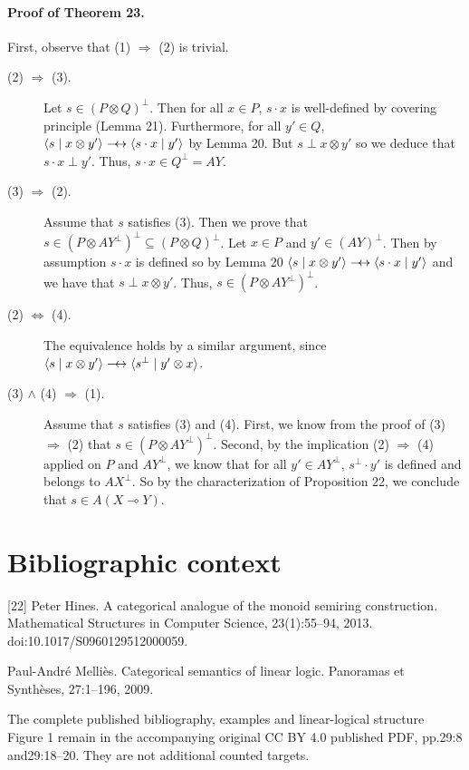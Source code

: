 \documentclass[10pt,a4paper]{article}
\newcommand{\lolli}{\multimap}
\newcommand{\dequiv}{\mathrel{\relbar\joinrel\leftrightarrow}}
\newcommand{\scalar}[2]{\langle #1\mid #2\rangle}
\begin{document}
\paragraph{Proof of Theorem 23.} First, observe that (1) $\Rightarrow$ (2) is trivial.
\begin{description}
\item[(2) $\Rightarrow$ (3).] Let $s\in(P\otimes Q)^\perp$. Then for all $x\in P$, $s\cdot x$ is well-defined by covering principle (Lemma 21). Furthermore, for all $y'\in Q$, $\scalar{s}{x\otimes y'}\dequiv\scalar{s\cdot x}{y'}$ by Lemma 20. But $s\perp x\otimes y'$ so we deduce that $s\cdot x\perp y'$. Thus, $s\cdot x\in Q^\perp=AY$.
\item[(3) $\Rightarrow$ (2).] Assume that $s$ satisfies (3). Then we prove that $s\in(P\otimes AY^\perp)^\perp\subseteq(P\otimes Q)^\perp$. Let $x\in P$ and $y'\in(AY)^\perp$. Then by assumption $s\cdot x$ is defined so by Lemma 20 $\scalar{s}{x\otimes y'}\dequiv\scalar{s\cdot x}{y'}$ and we have that $s\perp x\otimes y'$. Thus, $s\in(P\otimes AY^\perp)^\perp$.
\item[(2) $\Leftrightarrow$ (4).] The equivalence holds by a similar argument, since $\scalar{s}{x\otimes y'}\dequiv\scalar{s^\perp}{y'\otimes x}$.
\item[(3) $\wedge$ (4) $\Rightarrow$ (1).] Assume that $s$ satisfies (3) and (4). First, we know from the proof of (3) $\Rightarrow$ (2) that $s\in(P\otimes AY^\perp)^\perp$. Second, by the implication (2) $\Rightarrow$ (4) applied on $P$ and $AY^\perp$, we know that for all $y'\in AY^\perp$, $s^\perp\cdot y'$ is defined and belongs to $AX^\perp$. So by the characterization of Proposition 22, we conclude that $s\in A(X\lolli Y)$.
\end{description}

\section*{Bibliographic context}
[22] Peter Hines. A categorical analogue of the monoid semiring construction. Mathematical Structures in Computer Science, 23(1):55--94, 2013. doi:10.1017/S0960129512000059.\par
[38] Paul-Andr\'e Melli\`es. Categorical semantics of linear logic. Panoramas et Synth\`eses, 27:1--196, 2009.\par
The complete published bibliography, examples and linear-logical structure Figure 1 remain in the accompanying original CC BY 4.0 published PDF, pp.29:8 and29:18--20. They are not additional counted targets.
\end{document}

